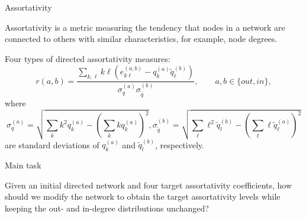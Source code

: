 \documentclass[xcolor=dvipsnames, compress, 10pt]{beamer}
\theoremstyle{remark}
\newcommand{\tq}{\tilde{q}}
\begin{document}
\begin{frame}{Assortativity}

Assortativity is a metric measuring the tendency that nodes in a network are
connected to others with similar characteristics, for example,
node degrees.

\vspace{0.1cm}

Four types of directed assortativity measures:
\begin{equation*}
  	r(a, b) = 
    \frac{\sum_{k,\ell} k\ell \left(e^{(a,b)}_{k\ell} - q_k^{(a)} 
    \tq_\ell^{(b)}\right)}{\sigma_q^{(a)} \sigma_{\tq}^{(b)}},
    \qquad a,b \in \{out,in\},
\end{equation*} 
where 
\[
\sigma_q^{(a)} = 
\sqrt{\sum_k k^2 q_k^{(a)} - \left(\sum_k k q_k^{(a)}\right)^2}, 
\sigma_{\tq}^{(b)} = 
\sqrt{\sum_\ell \ell^2 \tq_l^{(b)} - 
	\left(\sum_\ell \ell \tq_\ell^{(a)}\right)^2}
\]
are standard deviations of $q_k^{(a)}$ and $\tq_l^{(b)}$, 
respectively.





\end{frame}



\begin{frame}{Main task}


Given an initial directed network and four target assortativity coefficients,
how should we modify the network to obtain the 
target assortativity levels while keeping the out- and in-degree distributions
unchanged?
	
	
\end{frame}
\end{document}
